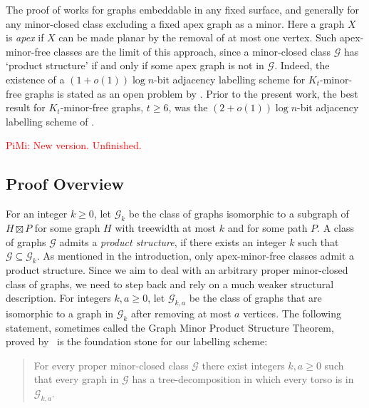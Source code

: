\documentclass{patmorin}
\renewcommand{\geq}{\geqslant}
\newcommand{\piotr}[1]{\noindent\textcolor{red}{PiMi: #1}}
\newcommand{\defin}[1]{\emph{\textcolor{brightmaroon}{#1}}}
\begin{document}
The proof of \citet{dujmovic.esperet.ea:adjacency} works for  graphs embeddable in any fixed surface, and generally for any minor-closed class excluding a fixed apex graph as a minor. Here a graph $X$ is \defin{apex} if $X$ can be made planar by the removal of at most one vertex.
Such apex-minor-free classes are the limit of this approach, since a minor-closed class $\mathcal{G}$ has `product structure' if and only if some apex graph is not in $\mathcal{G}$. Indeed, the existence of a $(1+o(1))\log n$-bit adjacency labelling scheme for $K_t$-minor-free graphs is stated as an open problem by \citet[Section~6, Problem~2]{dujmovic.esperet.ea:adjacency}. Prior to the present work, the best result for $K_t$-minor-free graphs, $t\geq 6$, was the $(2+o(1))\log n$-bit adjacency labelling scheme of \citet{gavoille.labourel:shorter}.


\piotr{New version. Unfinished.}

\subsection{Proof Overview}

For an integer $k\geq 0$, let \defin{$\mathcal{G}_{k}$} be the class of graphs isomorphic to a subgraph of $H\boxtimes P$ for some graph $H$ with treewidth at most $k$ and for some path $P$.
A class of graphs $\mathcal{G}$ admits a \defin{product structure},
if there exists an integer $k$ such that $\mathcal{G}\subseteq \mathcal{G}_k$.
As mentioned in the introduction,
only apex-minor-free classes admit a  product structure.
Since we aim to deal with an arbitrary proper minor-closed class of graphs, we need to step back and rely on a much weaker structural description.
For integers $k,a\geq 0$, let \defin{$\mathcal{G}_{k,a}$} be the class of graphs that are isomorphic to a graph in $\mathcal{G}_k$ after removing at most $a$ vertices.
The following statement, sometimes called the Graph Minor Product Structure Theorem,  proved by~\citet{dujmovic.joret.ea:planar} is the foundation stone for our labelling scheme:
\begin{quote}
  For every proper minor-closed class $\mathcal{G}$ there exist integers $k,a\geq 0$ such that every graph in $\mathcal{G}$ has a tree-decomposition in which every torso is in $\mathcal{G}_{k,a}$.
\end{quote}
\end{document}
